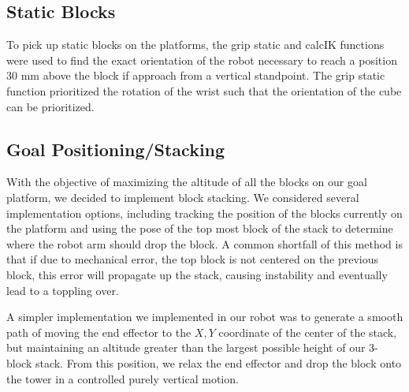 \documentclass{article}
\begin{document}
    \subsection{Static Blocks}
    To pick up static blocks on the platforms, the grip static and calcIK functions were used to find the exact orientation of the robot necessary to reach a position 30 mm above the block if approach from a vertical standpoint. The grip static function prioritized the rotation of the wrist such that the orientation of the cube can be prioritized. 
    
    \subsection{Goal Positioning/Stacking}
    
        With the objective of maximizing the altitude of all the blocks on our goal platform, we decided to implement block stacking. We considered several implementation options, including tracking the position of the blocks currently on the platform and using the pose of the top most block of the stack to determine where the robot arm should drop the block. A common shortfall of this method is that if due to mechanical error, the top block is not centered on the previous block, this error will propagate up the stack, causing instability and eventually lead to a toppling over.
		
		A simpler implementation we implemented in our robot was to generate a smooth path of moving the end effector to the $X, Y$ coordinate of the center of the stack, but maintaining an altitude greater than the largest possible height of our 3-block stack. From this position, we relax the end effector and drop the block onto the tower in a controlled purely vertical motion.
    
\end{document}
